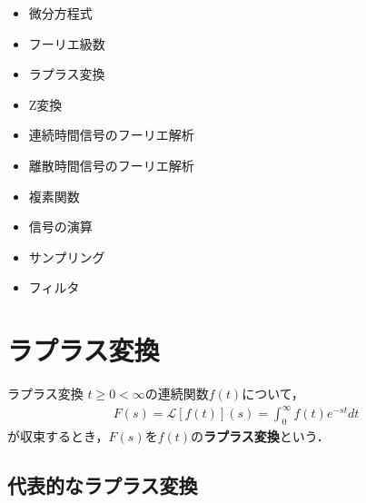 \documentclass[uplatex, dvipdfmx, fleqn, a4paper, 10pt]{ujreport}
\begin{document}
\begin{minipage}{0.33\linewidth}
    \begin{itemize}
        \item 微分方程式
        \item フーリエ級数
        \item ラプラス変換
        \item Z変換
    \end{itemize}
\end{minipage}
\hspace{0.05\linewidth}
\begin{minipage}{0.33\linewidth}
    \begin{itemize}
        \item 連続時間信号のフーリエ解析
        \item 離散時間信号のフーリエ解析
        \item 複素関数
    \end{itemize}
\end{minipage}
\hspace{0.05\linewidth}
\begin{minipage}{0.33\linewidth}
    \begin{itemize}
        \item 信号の演算
        \item サンプリング
        \item フィルタ
    \end{itemize}
\end{minipage}

\section{ラプラス変換}\label{sec:laplace_transform}

\begin{defbox}{ラプラス変換}
    $t \ge 0 < \infty$の連続関数$f(t)$について，
    \begin{eqnarray}
        F(s) = \mathcal{L}[f(t)](s) = \int_{0}^{\infty} f(t)e^{-st} dt
        \label{eq:laplace_transform}
    \end{eqnarray}
    が収束するとき，$F(s)$を$f(t)$の\textbf{ラプラス変換}という．
\end{defbox}

\subsection{代表的なラプラス変換}
\end{document}
